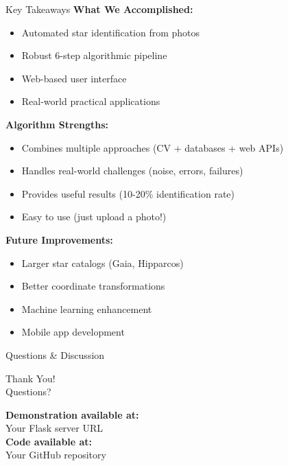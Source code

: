 \documentclass[aspectratio=169]{beamer}
\begin{document}
\begin{frame}{Key Takeaways}
\textbf{What We Accomplished:}
\begin{itemize}
\item Automated star identification from photos
\item Robust 6-step algorithmic pipeline
\item Web-based user interface
\item Real-world practical applications
\end{itemize}

\textbf{Algorithm Strengths:}
\begin{itemize}
\item \textcolor{stargreen}{Combines multiple approaches} (CV + databases + web APIs)
\item \textcolor{stargreen}{Handles real-world challenges} (noise, errors, failures)
\item \textcolor{stargreen}{Provides useful results} (10-20\% identification rate)
\item \textcolor{stargreen}{Easy to use} (just upload a photo!)
\end{itemize}

\textbf{Future Improvements:}
\begin{itemize}
\item Larger star catalogs (Gaia, Hipparcos)
\item Better coordinate transformations
\item Machine learning enhancement
\item Mobile app development
\end{itemize}
\end{frame}

\begin{frame}{Questions \& Discussion}
\begin{center}
\Huge Thank You! \\[1cm]

\Large Questions?

\vspace{1cm}

\normalsize
\textcolor{starblue}{\textbf{Demonstration available at:}} \\
Your Flask server URL \\[0.5cm]

\textcolor{stargreen}{\textbf{Code available at:}} \\
Your GitHub repository
\end{center}
\end{frame}
\end{document}
